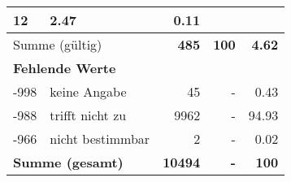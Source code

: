 \begin{longtable}{lXrrr}
       \num{12} &
       \num[round-mode=places,round-precision=2]{2,47} &
         \num[round-mode=places,round-precision=2]{0,11} \\
     \midrule
     \multicolumn{2}{l}{Summe (gültig)} &
       \textbf{\num{485}} &
     \textbf{100} &
       \textbf{\num[round-mode=places,round-precision=2]{4,62}} \\
     \multicolumn{5}{l}{\textbf{Fehlende Werte}}\\
       -998 &
       keine Angabe &
         \num{45} &
        - &
         \num[round-mode=places,round-precision=2]{0,43} \\
       -988 &
       trifft nicht zu &
         \num{9962} &
        - &
         \num[round-mode=places,round-precision=2]{94,93} \\
       -966 &
       nicht bestimmbar &
         \num{2} &
        - &
         \num[round-mode=places,round-precision=2]{0,02} \\
     \midrule
     \multicolumn{2}{l}{\textbf{Summe (gesamt)}} &
          \textbf{\num{10494}} &
        \textbf{-} &
        \textbf{100} \\
     \bottomrule
     \end{longtable}
     
